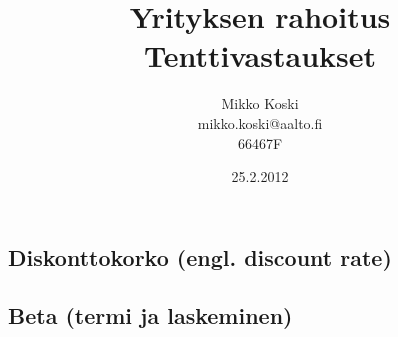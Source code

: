 \documentclass[a4paper]{article}
\begin{document}
\title{\small Yrityksen rahoitus \\ \huge Tenttivastaukset}
\date{25.2.2012}
\author{Mikko Koski \\ mikko.koski@aalto.fi \\ 66467F}
\maketitle

\normalsize
\setlength{\parindent}{0cm}


\subsection{Diskonttokorko (engl. discount rate)}

\subsection{Beta (termi ja laskeminen)}
\end{document}
